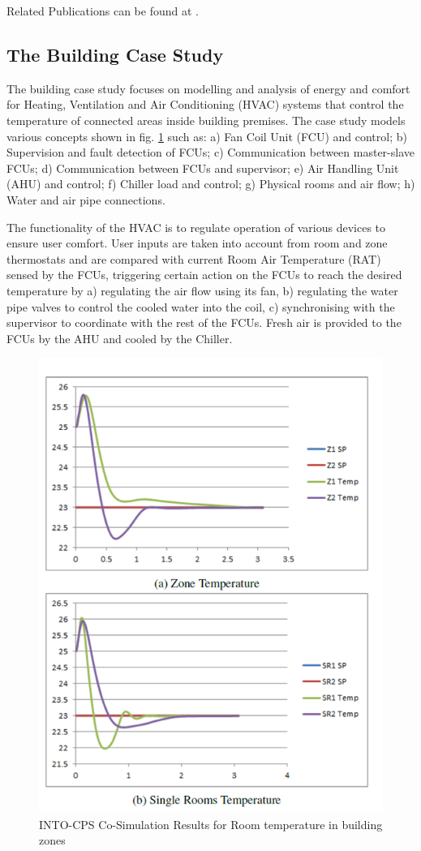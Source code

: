 Related Publications can be found at \cite{Foldager&17,Foldager&18}.


\subsection{The Building Case Study } 
 The building case study focuses on modelling and analysis of energy and comfort for Heating, Ventilation and Air Conditioning (HVAC) systems that control the temperature of connected areas inside building premises. The case study models various concepts shown in fig. \ref{fig:building} such as: a) Fan Coil Unit (FCU) and control; b) Supervision and fault detection of FCUs; c) Communication between master-slave FCUs; d) Communication between FCUs and supervisor; e) Air Handling Unit (AHU) and control; f) Chiller load and control; g) Physical rooms and air flow; h) Water and air pipe connections.

The functionality of the HVAC is to regulate operation of various devices to ensure user comfort. User inputs are taken into account from room and zone thermostats and are compared with current Room Air Temperature (RAT) sensed by the FCUs, triggering certain action on the FCUs to reach the desired temperature by a) regulating the air flow using its fan, b) regulating the water pipe valves to control the cooled water into the coil, c) synchronising with the supervisor to coordinate with the rest of the FCUs. Fresh air is provided to the FCUs by the AHU and cooled by the Chiller.

\begin{figure}[!ht]
	\centering
		\includegraphics[width=0.9 \textwidth]{./figures/building}
	\caption{INTO-CPS Co-Simulation Results for Room temperature in building zones}
	\label{fig:building}
\end{figure}

